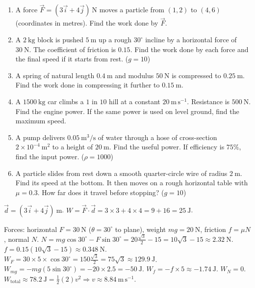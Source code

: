\documentclass[11pt]{article}
\begin{document}
\begin{exercice}
\begin{enumerate}
\item A force $\vec{F} = (3\vec{i} + 4\vec{j})\ \mathrm{N}$ moves a particle from $(1,2)$ to $(4,6)$ (coordinates in metres). Find the work done by $\vec{F}$.
\item A $2\ \mathrm{kg}$ block is pushed $5\ \mathrm{m}$ up a rough $30^{\circ}$ incline by a horizontal force of $30\ \mathrm{N}$. The coefficient of friction is $0.15$. Find the work done by each force and the final speed if it starts from rest. ($g=10$)
\item A spring of natural length $0.4\ \mathrm{m}$ and modulus $50\ \mathrm{N}$ is compressed to $0.25\ \mathrm{m}$. Find the work done in compressing it further to $0.15\ \mathrm{m}$.
\item A $1500\ \mathrm{kg}$ car climbs a $1$ in $10$ hill at a constant $20\ \mathrm{m\,s^{-1}}$. Resistance is $500\ \mathrm{N}$. Find the engine power. If the same power is used on level ground, find the maximum speed.
\item A pump delivers $0.05\ \mathrm{m^3/s}$ of water through a hose of cross-section $2 \times 10^{-4}\ \mathrm{m^2}$ to a height of $20\ \mathrm{m}$. Find the useful power. If efficiency is $75\%$, find the input power. ($\rho=1000$)
\item A particle slides from rest down a smooth quarter-circle wire of radius $2\ \mathrm{m}$. Find its speed at the bottom. It then moves on a rough horizontal table with $\mu=0.3$. How far does it travel before stopping? ($g=10$)
\end{enumerate}
\end{exercice}

\begin{corrige}[Exercise 1]
$\vec{d} = (3\vec{i} + 4\vec{j})\ \mathrm{m}$. $W = \vec{F}\cdot\vec{d} = 3\times3 + 4\times4 = 9+16 = 25\ \mathrm{J}$.
\end{corrige}

\begin{corrige}[Exercise 2]
Forces: horizontal $F=30\ \mathrm{N}$ ($\theta=30^{\circ}$ to plane), weight $mg=20\ \mathrm{N}$, friction $f=\mu N$, normal $N$.
$N = mg\cos30^{\circ} - F\sin30^{\circ} = 20\frac{\sqrt{3}}{2} - 15 = 10\sqrt{3}-15 \approx 2.32\ \mathrm{N}$.
$f = 0.15(10\sqrt{3}-15) \approx 0.348\ \mathrm{N}$.
$W_F = 30 \times 5 \times \cos30^{\circ} = 150\frac{\sqrt{3}}{2} = 75\sqrt{3} \approx 129.9\ \mathrm{J}$.
$W_{mg} = -mg(5\sin30^{\circ}) = -20 \times 2.5 = -50\ \mathrm{J}$.
$W_f = -f \times 5 \approx -1.74\ \mathrm{J}$.
$W_N = 0$.
$W_{\text{total}} \approx 78.2\ \mathrm{J} = \frac{1}{2}(2)v^2 \Rightarrow v \approx 8.84\ \mathrm{m\,s^{-1}}$.
\end{corrige}
\end{document}

